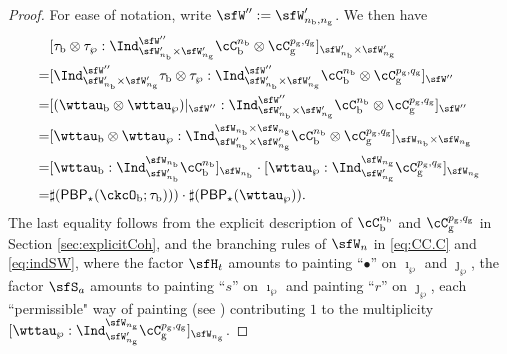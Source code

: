 \documentclass[12pt,a4paper]{amsart}
\numberwithin{equation}{section}
\theoremstyle{remark}
\def\nbb{n_{\mathrm b}}
\def\PBP{\mathsf{PBP}}
\begin{document}
{\begin{proof}
  For ease of notation, write $\sfW'':=\sfW_{n_{\mathrm b},n_{\mathrm g}}'$. We then have
  \[
    \begin{split}
      & [\tau_{\mathrm b}\otimes \tau_{\wp} :
      \Ind_{\sfW'_{n_{\mathrm b}}\times \sfW'_{n_{\mathrm g}}}^{\sfW''} \cC_{\mathrm b}^{\nbb} \otimes \cC_{\mathrm g}^{p_{\mathrm g},q_{\mathrm g}}]_{\sfW'_{n_{\mathrm b}}\times \sfW'_{n_{\mathrm g}}}\\
      = & [\Ind_{\sfW'_{n_{\mathrm b}}\times \sfW'_{n_{\mathrm g}}}^{\sfW''} \tau_{\mathrm b}\otimes \tau_{\wp} :
      \Ind_{\sfW'_{n_{\mathrm b}}\times \sfW'_{n_{\mathrm g}}}^{\sfW''} \cC_{\mathrm b}^{\nbb} \otimes \cC_{\mathrm g}^{p_{\mathrm g},q_{\mathrm g}}]_{\sfW''}\\
      = & [(\wttau_{\mathrm b}\otimes \wttau_{\wp})|_{\sfW''}:
      \Ind_{\sfW'_{n_{\mathrm b}}\times \sfW'_{n_{\mathrm g}}}^{\sfW''} \cC_{\mathrm b}^{\nbb} \otimes \cC_{\mathrm g}^{p_{\mathrm g},q_{\mathrm g}}]_{\sfW''}\\
      = & [\wttau_{\mathrm b}\otimes \wttau_{\wp}:
      \Ind_{\sfW'_{n_{\mathrm b}}\times \sfW'_{n_{\mathrm g}}}^{\sfW_{n_{\mathrm b}}\times \sfW_{n_{\mathrm g}}} \cC_{\mathrm b}^{\nbb} \otimes \cC_{\mathrm g}^{p_{\mathrm g},q_{\mathrm g}}]_{\sfW_{n_{\mathrm b}}\times \sfW_{n_{\mathrm g}}}\\
       = & [\wttau_{\mathrm b}:\Ind_{\sfW'_{n_{\mathrm b}}}^{\sfW_{n_{\mathrm b}}} \cC_{\mathrm b}^{\nbb}]_{\sfW_{n_{\mathrm b}}}\cdot
           [\wttau_{\wp}:\Ind_{\sfW'_{n_{\mathrm g}}}^{\sfW_{n_{\mathrm g}}} \cC_{\mathrm g}^{p_{\mathrm g},q_{\mathrm g}}]_{\sfW_{n_{\mathrm g}}}\\
      =& \sharp(\PBP_{\star}(\ckcO_{\mathrm b}; \tau _{\mathrm b})))\cdot \sharp(\PBP_{\star}(\wttau_{\wp})).
    \end{split}
  \]
  The last equality follows from the explicit description of $\cC_{\mathrm b}^{\nbb}$ and $\cC_{\mathrm g}^{p_{\mathrm g},q_{\mathrm g}}$ in Section \ref{sec:explicitCoh}, and
  the branching rules of $\sfW_{n}$ in \eqref{eq:CC.C} and \eqref{eq:indSW}, where the factor $\sfH_{t}$ amounts to painting ``$\bullet$'' on $\imath_{\wp}$ and $\jmath_{\wp}$, the factor $\sfS_{a}$ amounts to painting ``$s$'' on $\imath_{\wp}$ and painting ``$r$'' on $\jmath_{\wp}$, each ``permissible" way of painting (see )
  contributing $1$ to the multiplicity $[\wttau_{\wp}:\Ind_{\sfW'_{n_{\mathrm g}}}^{\sfW_{n_{\mathrm g}}} \cC_{\mathrm g}^{p_{\mathrm g},q_{\mathrm g}}]_{\sfW_{n_{\mathrm g}}}$.
\end{proof}

}
\end{document}
